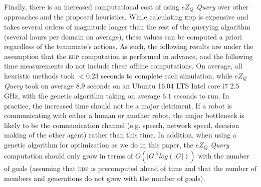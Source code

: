 \documentclass[letterpaper]{article}
\begin{document}


Finally, there is an increased computational cost of using \emph{$eZ_Q$ Query} over other approaches and the proposed heuristics. While calculating \textsc{ed}p is expensive and takes several orders of magnitude longer than the rest of the querying algorithm (several hours per domain on average), these values 
can be computed a priori regardless of the teammate's actions. As such, the following results are under the assumption that the \textsc{edp} computation is performed in advance, and the following time measurements do not include these offline computations. %
On average, all heuristic methods took $<0.23$ seconds to complete each simulation, while \emph{$eZ_Q$ Query} took on average $8.9$ seconds on an Ubuntu 16.04 LTS Intel core i7 2.5 GHz, with the genetic algorithm taking on average $6.1$ seconds to run. In practice, the increased time should not be a major detriment. If a robot is communicating with either a human or another robot, the major bottleneck is likely to be the communication channel (e.g. speech, network speed, decision making of the other agent) rather than this time. In addition, when using a genetic algorithm for optimization as we do in this paper, the \emph{$eZ_Q$ Query} computation should only grow in terms of $O(|G|^2log(|G|))$ with the number of goals (assuming that \textsc{edp} is precomputed ahead of time and that the number of members and generations do not grow with the number of goals).





\end{document}
